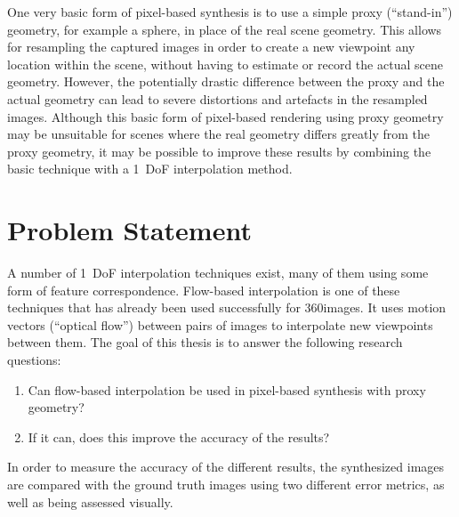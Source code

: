 One very basic form of pixel-based synthesis is to use a simple proxy (``stand-in'') geometry, for example a sphere, in place of the real scene geometry\footnotemark. This allows for resampling the captured images in order to create a new viewpoint any location within the scene, without having to estimate or record the actual scene geometry. However, the potentially drastic difference between the proxy and the actual geometry can lead to severe distortions and artefacts in the resampled images. Although this basic form of pixel-based rendering using proxy geometry may be unsuitable for scenes where the real geometry differs greatly from the proxy geometry, it may be possible to improve these results by combining the basic technique with a 1~DoF interpolation method.

\section*{Problem Statement}
A number of 1~DoF interpolation techniques exist, many of them using some form of feature correspondence. Flow-based interpolation is one of these techniques that has already been used successfully for 360\degree images. It uses motion vectors (``optical flow'') between pairs of images to interpolate new viewpoints between them. The goal of this thesis is to answer the following research questions:

\begin{enumerate}
  \item Can flow-based interpolation be used in pixel-based synthesis with proxy geometry?
  \item If it can, does this improve the accuracy of the results?
\end{enumerate}

In order to measure the accuracy of the different results, the synthesized images are compared with the ground truth images using two different error metrics, as well as being assessed visually.


